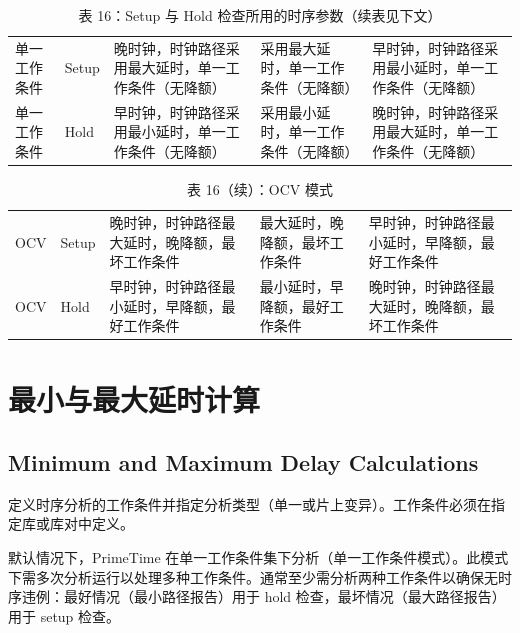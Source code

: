 \begin{table}[htbp]
\centering
\caption{表 16：Setup 与 Hold 检查所用的时序参数（续表见下文）}
\small
\begin{tabular}{|L{1.8cm}|L{1.2cm}|L{3.2cm}|L{3.2cm}|L{3.2cm}|}
\hline
{} &  &  &  &  \\
\hline
单一工作条件 & Setup & 晚时钟，时钟路径采用最大延时，单一工作条件（无降额） & 采用最大延时，单一工作条件（无降额） & 早时钟，时钟路径采用最小延时，单一工作条件（无降额） \\
单一工作条件 & Hold & 早时钟，时钟路径采用最小延时，单一工作条件（无降额） & 采用最小延时，单一工作条件（无降额） & 晚时钟，时钟路径采用最大延时，单一工作条件（无降额） \\
\hline
\end{tabular}
\end{table}

\begin{table}[htbp]
\centering
\caption{表 16（续）：OCV 模式}
\small
\begin{tabular}{|L{1.8cm}|L{1.2cm}|L{3.2cm}|L{3.2cm}|L{3.2cm}|}
\hline
{} &  &  &  &  \\
\hline
OCV & Setup & 晚时钟，时钟路径最大延时，晚降额，最坏工作条件 & 最大延时，晚降额，最坏工作条件 & 早时钟，时钟路径最小延时，早降额，最好工作条件 \\
OCV & Hold & 早时钟，时钟路径最小延时，早降额，最好工作条件 & 最小延时，早降额，最好工作条件 & 晚时钟，时钟路径最大延时，晚降额，最坏工作条件 \\
\hline
\end{tabular}
\end{table}

\section{最小与最大延时计算}
\subsection*{Minimum and Maximum Delay Calculations}

 定义时序分析的工作条件并指定分析类型（单一或片上变异）。工作条件必须在指定库或库对中定义。

默认情况下，PrimeTime 在单一工作条件集下分析（单一工作条件模式）。此模式下需多次分析运行以处理多种工作条件。通常至少需分析两种工作条件以确保无时序违例：最好情况（最小路径报告）用于 hold 检查，最坏情况（最大路径报告）用于 setup 检查。

